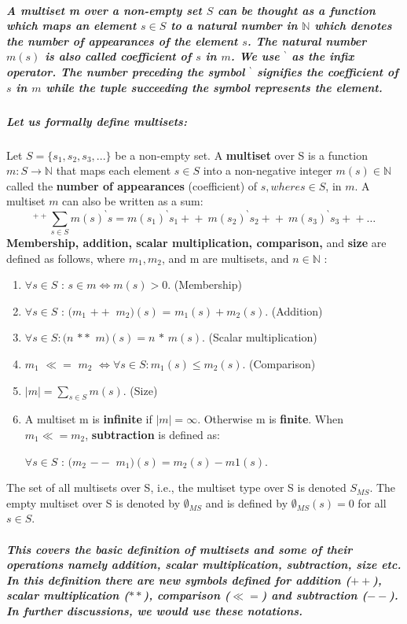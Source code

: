 \subparagraph*{\textnormal{A \textit{\textbf{multiset} m} over a non-empty set $S$ can be thought as a function which maps an element $s \in S$ to a natural number in $\mathbb{N}$ which denotes the number of appearances of the element $s$. The natural number $m(s)$ is also called coefficient of $s$ in $m$. We use ${}^{\backprime}$ as the infix operator. The number preceding the symbol ${}^{\backprime}$ signifies the coefficient of $s$ in $m$ while the tuple succeeding the symbol represents the element.
}}
\subparagraph*{\textnormal{Let us formally define multisets:}}
\begin{defs}
	\label{defs:Multiset}
	Let $S = \{ s_{1}, s_{2}, s_{3}, . . . \}$ be a non-empty set. A \textbf{multiset} over S is
	a function $m : S \rightarrow \mathbb{N}$ that maps each element $s \in S$ into a non-negative integer $m(s) \in \mathbb{N}$ called the \textbf{number of appearances} (coefficient) of $s, where s \in S$, in $m$. A multiset $m$ can also be written as a sum:
	\begin{equation*}
	_{}^{++}\sum\limits_{s \in S}^{ } {m(s)}^{\backprime}s = {m(s_{1})}^{\backprime} s_{1} +\!\!+ \ {m(s_{2})}^{\backprime}s_{2} +\!\!+ \ {m(s_{3})}^{\backprime} s_{3} +\!\!+ \ldots
	\end{equation*}
	\textbf{Membership, addition, scalar multiplication, comparison,} and \textbf{size} are defined
	as follows, where $m_{1}, m_{2}$, and m are multisets, and $n \in \mathbb{N}$ :
	\begin{enumerate}
		\item $\forall s \in S$ : $s \in m \Leftrightarrow  m(s) > 0$. (Membership)
		\item $\forall s \in S$ : $(m_{1}$ $+\!+$ $m_{2})(s)$ = $m_{1}(s) + m_{2}(s)$. (Addition)
		\item $\forall s \in S : (n$ $\ast\!\ast$ $m)(s) = n$ $\ast$ $m(s)$. (Scalar multiplication)
		\item $m_{1}$ $\ll=$ $m_{2}$ $\Leftrightarrow \forall s \in S : m_{1}(s) \leq m_{2}(s)$. (Comparison)
		\item $\left | m \right | = \sum\limits_{s \in S} m(s)$. (Size)
		\item A multiset m is \textbf{infinite} if $\left | m \right | = \infty$. Otherwise m is \textbf{finite}. When $m_{1} \ll= m_{2}$, \textbf{subtraction} is defined as:
		\begin{center}
			$\forall s \in S$ : $(m_{2}$ $--$ $m_{1})(s) = m_{2}(s) - m{1}(s).$
		\end{center}
	\end{enumerate}
	The set of all multisets over S, i.e., the multiset type over S is denoted $S_{MS}$. The
	empty multiset over S is denoted by $\emptyset_{MS}$ and is defined by $\emptyset_{MS}(s) = 0$ for all $s \in S$.
\end{defs}
\subparagraph*{\textnormal{This covers the basic definition of multisets and some of their operations namely addition, scalar multiplication, subtraction, size etc. In this definition there are new symbols defined for addition ($+\!+$), scalar multiplication ($\ast\!\ast$), comparison ($\ll=$) and subtraction ($--$). In further discussions, we would use these notations.}}


